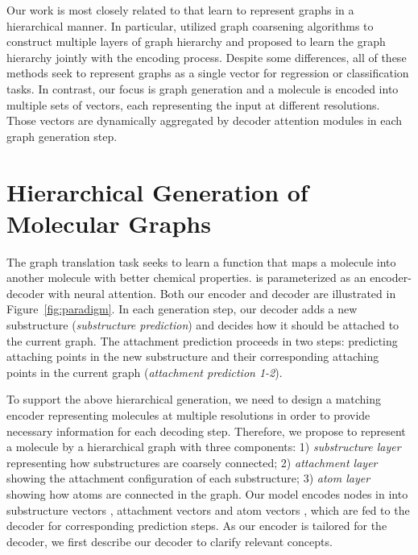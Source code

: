 \documentclass{article} \usepackage{iclr2020_conference,times}
\begin{document}
Our work is most closely related to \citep{defferrard2016convolutional,ying2018hierarchical,gao2019graph} that learn to represent graphs in a hierarchical manner. In particular, \citet{defferrard2016convolutional} utilized graph coarsening algorithms to construct multiple layers of graph hierarchy and
\citet{ying2018hierarchical,gao2019graph} proposed to learn the graph hierarchy jointly with the encoding process.
Despite some differences, all of these methods seek to represent graphs as a single vector for regression or classification tasks. In contrast, our focus is graph generation and a molecule is encoded into multiple sets of vectors, each representing the input at different resolutions. Those vectors are dynamically aggregated by decoder attention modules in each graph generation step.
%
 \section{Hierarchical Generation of Molecular Graphs}

The graph translation task seeks to learn a function  that maps a molecule  into another molecule  with better chemical properties.  is parameterized as an encoder-decoder with neural attention.
Both our encoder and decoder are illustrated in Figure~\ref{fig:paradigm}.
In each generation step, our decoder adds a new substructure (\emph{substructure prediction}) and decides how it should be attached to the current graph. The attachment prediction proceeds in two steps: predicting attaching points in the new substructure and their corresponding attaching points in the current graph (\emph{attachment prediction 1-2}). 

To support the above hierarchical generation, we need to design a matching encoder representing molecules at multiple resolutions in order to provide necessary information for each decoding step. 
Therefore, we propose to represent a molecule  by a hierarchical graph  with three components: 1) \emph{substructure layer} representing how substructures are coarsely connected; 2) \emph{attachment layer} showing the attachment configuration of each substructure; 3) \emph{atom layer} showing how atoms are connected in the graph. Our model encodes nodes in  into substructure vectors , attachment vectors  and atom vectors , which are fed to the decoder for corresponding prediction steps.
As our encoder is tailored for the decoder, we first describe our decoder to clarify relevant concepts.
\end{document}

